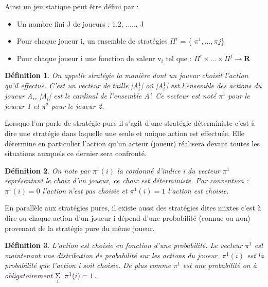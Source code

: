 \documentclass[a4paper, 12pt, twoside]{article}
\newtheorem{definition}{Définition}
\begin{document}
Ainsi un \textsf{jeu statique} peut être défini par : 
\begin{itemize}
\item Un nombre fini J de joueurs : {1,2, ....., J}
\item Pour chaque joueur \textsf{i}, un ensemble de stratégies $ \Pi^{i} $ = \{ $ \pi^{1} ,...,\pi{j} $\}
\item Pour chaque joueur \textsf{i} une fonction de valeur \textsf{v}$_{i}$ tel que : 
$ \Pi^{i} \times ... \times \Pi^{j} \rightarrow \mathbf{R} $
\end{itemize}

\begin{definition}
On appelle stratégie la manière dont un joueur choisit l'action qu'il effectue. C'est un vecteur de taille |A$ _{i} ^{1}$| où |A$ _{i} ^{1}$| est l'ensemble des actions du joueur A,, |A$_{i}$| est le cardinal de l'ensemble A'. Ce vecteur est noté $\pi^{1}$ pour le joueur 1 et $\pi^{2}$ pour le joueur 2.
\end{definition}

Lorsque l'on parle de stratégie pure il s'agit d'une stratégie déterministe c'est à dire une stratégie dans laquelle une seule et unique action est effectuée. Elle détermine en particulier l'action qu'un acteur (joueur) réalisera devant toutes les situations auxquels ce dernier sera confronté. \newline

\begin{definition}
On note par $ \pi^{1}(i)$ la cordonné d'indice i du vecteur $\pi^{1}$ représentant le choix d'un joueur, ce choix est déterministe. Par convention :   $\pi^{1}(i) = 0$ l'action n'est pas choisie et  $\pi^{1}(i) =1$ l'action est choisie.
\end{definition}

En parallèle aux stratégies pures, il existe aussi des stratégies dites mixtes c'est à dire ou chaque action d'un joueur i  dépend d'une probabilité (connue ou non) provenant de la stratégie pure du même joueur. \newline


\begin{definition}
L'action est choisie en fonction d'une probabilité. Le vecteur $\pi^{1}$ est maintenant une distribution  de probabilité sur les actions du joueur. $\pi^{1}(i)$ est la probabilité que l'action i soit choisie. De plus comme  $\pi^{1}$ est une probabilité on à obligatoirement $\underset{i}{\Sigma}  \hspace{0,2 cm} \pi^{1}(i) = 1$.
\end{definition}
\end{document}
